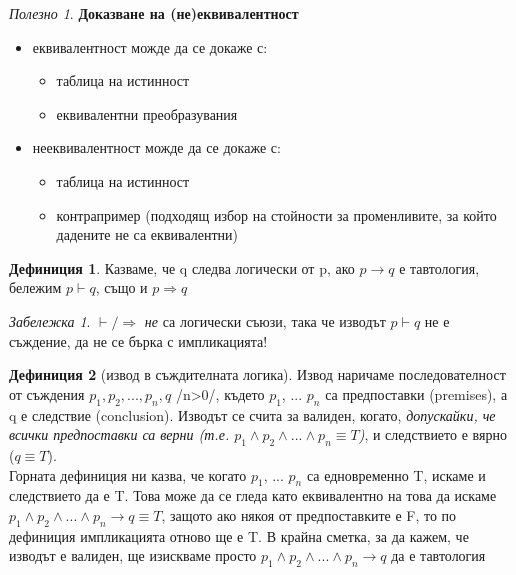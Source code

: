 \documentclass[10pt, a4paper]{article}
\theoremstyle{definition}
\newtheorem{definition}{Дефиниция}[section]
\theoremstyle{remark}
\newtheorem*{remark}{Забележка}
\newtheorem*{tip}{Полезно}
\begin{document}
\begin{tip}
\textbf{Доказване на (не)еквивалентност}
    \begin{itemize}
        \item еквивалентност можде да се докаже с:
            \begin{itemize}
                \item таблица на истинност
                \item еквивалентни преобразувания
            \end{itemize}
        \item нееквивалентност можде да се докаже с:
            \begin{itemize}
                \item таблица на истинност
                \item контрапример (подходящ избор на стойности за променливите, за който дадените не са еквивалентни)
            \end{itemize}
    \end{itemize}
\end{tip}

\begin{definition}
    Казваме, че q следва логически от p, ако \(p\rightarrow q\) е тавтология, бележим \(p\vdash q\), също и \(p\Rightarrow q\)
\end{definition}
\begin{remark}\(\vdash/ \Rightarrow\) \emph{не} са логически съюзи, така че изводът \(p\vdash q\) не е съждение, да не се бърка с импликацията!\end{remark}

\begin{definition}[извод в съждителната логика]
    \label{def1.9}
    Извод наричаме последователност от съждения \(p_1, p_2, ...,p_n, q\) /n>0/, където \(p_1\), ... \(p_n\) са предпоставки (premises), а q е следствие (conclusion). Изводът се счита за валиден, когато, \emph{допускайки, че всички предпоставки са верни (т.е. \(p_1\wedge p_2\wedge ... \wedge p_n\equiv T\))}, и следствието е вярно (\(q\equiv T\)). \\Горната дефиниция ни казва, че когато \(p_1\), ... \(p_n\) са едновременно T, искаме и следствието да е T. Това може да се гледа като еквивалентно на това да искаме \(p_1\wedge p_2\wedge ... \wedge p_n\rightarrow q\equiv T\), защото ако някоя от предпоставките е F, то по дефиниция импликацията отново ще е T. В крайна сметка, за да кажем, че изводът е валиден, ще изискваме просто \(p_1\wedge p_2\wedge ... \wedge p_n\rightarrow q\) да е тавтология
\end{definition}
\end{document}
